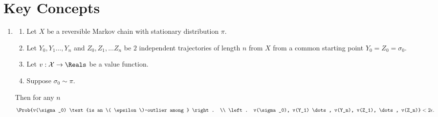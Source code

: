 \documentclass[12pt]{article}
\begin{document}
\section*{Key Concepts}
\renewcommand{\theenumii}{\arabic{enumii}}
\begin{enumerate}
    \item
        \begin{theorem}
            \label{thm:parallelsignificance:twoepstest}
            \begin{enumerate}
                \item
                    Let \( X \) be a reversible Markov chain with
                    stationary distribution \( \pi \).
                \item
                    Let \( Y_0, Y_1 \dots, Y_n \) and \( Z_0, Z_1, \dots
                    Z_n \) be \( 2 \) independent trajectories of length
                    \( n \) from \( X \) from a common starting point \(
                    Y_0 = Z_0 = \sigma_0 \).
                \item
                    Let \( v :  \mathcal{X} \to \Reals \) be a value
                    function.
                \item
                    Suppose \( \sigma_0 \sim \pi \).
            \end{enumerate}
            Then for any \( n \)
            \begin{multline*}
                \Prob{v(\sigma_0) \text{is an \( \epsilon \)-outlier
                among } \right.  \\
                \left.  v(\sigma_0), v(Y_1) \dots, v(Y_n), v(Z_1), \dots,
                v(Z_n)} < 2 \epsilon.
            \end{multline*}


\end{theorem}
\end{enumerate}
\end{document}
